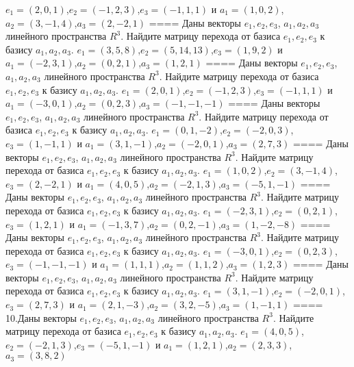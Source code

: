 \(e_{1} = (2,0,1)\),\(e_{2} = ( - 1,2,3)\),\(e_{3} = ( - 1,1,1)\) и \(a_{1} = (1,0,2)\),\(a_{2} = (3, - 1,4)\),\(a_{3} = (2, - 2,1)\)
====
Даны векторы \(e_{1},e_{2},e_{3}\), \(a_{1},a_{2},a_{3}\) линейного пространства \(R^{3}\). Найдите матрицу перехода от базиса \(e_{1},e_{2},e_{3}\) к базису \(a_{1},a_{2},a_{3}\).
\(e_{1} = (3,5,8)\),\(e_{2} = (5,14,13)\),\(e_{3} = (1,9,2)\) и \(a_{1} = ( - 2,3,1)\),\(a_{2} = (0,2,1)\),\(a_{3} = (1,2,1)\)
====
Даны векторы \(e_{1},e_{2},e_{3}\), \(a_{1},a_{2},a_{3}\) линейного пространства \(R^{3}\). Найдите матрицу перехода от базиса \(e_{1},e_{2},e_{3}\) к базису \(a_{1},a_{2},a_{3}\).
\(e_{1} = (2,0,1)\),\(e_{2} = ( - 1,2,3)\),\(e_{3} = ( - 1,1,1)\) и \(a_{1} = ( - 3,0,1)\),\(a_{2} = (0,2,3)\),\(a_{3} = ( - 1, - 1, - 1)\)
====
Даны векторы \(e_{1},e_{2},e_{3}\), \(a_{1},a_{2},a_{3}\) линейного пространства \(R^{3}\). Найдите матрицу перехода от базиса \(e_{1},e_{2},e_{3}\) к базису \(a_{1},a_{2},a_{3}\).
\(e_{1} = (0,1, - 2)\),\(e_{2} = ( - 2,0,3)\),\(e_{3} = (1, - 1,1)\) и \(a_{1} = (3,1, - 1)\),\(a_{2} = ( - 2,0,1)\),\(a_{3} = (2,7,3)\)
====
Даны векторы \(e_{1},e_{2},e_{3}\), \(a_{1},a_{2},a_{3}\) линейного пространства \(R^{3}\). Найдите матрицу перехода от базиса \(e_{1},e_{2},e_{3}\) к базису \(a_{1},a_{2},a_{3}\).
\(e_{1} = (1,0,2)\),\(e_{2} = (3, - 1,4)\),\(e_{3} = (2, - 2,1)\) и \(a_{1} = (4,0,5)\),\(a_{2} = ( - 2,1,3)\),\(a_{3} = ( - 5,1, - 1)\)
====
Даны векторы \(e_{1},e_{2},e_{3}\), \(a_{1},a_{2},a_{3}\) линейного пространства \(R^{3}\). Найдите матрицу перехода от базиса \(e_{1},e_{2},e_{3}\) к базису \(a_{1},a_{2},a_{3}\).
\(e_{1} = ( - 2,3,1)\),\(e_{2} = (0,2,1)\),\(e_{3} = (1,2,1)\) и \(a_{1} = ( - 1,3,7)\),\(a_{2} = (0,2, - 1)\),\(a_{3} = (1, - 2, - 8)\)
====
Даны векторы \(e_{1},e_{2},e_{3}\), \(a_{1},a_{2},a_{3}\) линейного пространства \(R^{3}\). Найдите матрицу перехода от базиса \(e_{1},e_{2},e_{3}\) к базису \(a_{1},a_{2},a_{3}\).
\(e_{1} = ( - 3,0,1)\),\(e_{2} = (0,2,3)\),\(e_{3} = ( - 1, - 1, - 1)\) и \(a_{1} = (1,1,1)\),\(a_{2} = (1,1,2)\),\(a_{3} = (1,2,3)\)
====
Даны векторы \(e_{1},e_{2},e_{3}\), \(a_{1},a_{2},a_{3}\) линейного пространства \(R^{3}\). Найдите матрицу перехода от базиса \(e_{1},e_{2},e_{3}\) к базису \(a_{1},a_{2},a_{3}\).
\(e_{1} = (3,1, - 1)\),\(e_{2} = ( - 2,0,1)\),\(e_{3} = (2,7,3)\) и \(a_{1} = (2,1, - 3)\),\(a_{2} = (3,2, - 5)\),\(a_{3} = (1, - 1,1)\)
====
10.Даны векторы \(e_{1},e_{2},e_{3}\), \(a_{1},a_{2},a_{3}\) линейного пространства \(R^{3}\). Найдите матрицу перехода от базиса \(e_{1},e_{2},e_{3}\) к базису \(a_{1},a_{2},a_{3}\).
\(e_{1} = (4,0,5)\),\(e_{2} = ( - 2,1,3)\),\(e_{3} = ( - 5,1, - 1)\) и \(a_{1} = (1,2,1)\),\(a_{2} = (2,3,3)\),\(a_{3} = (3,8,2)\)

